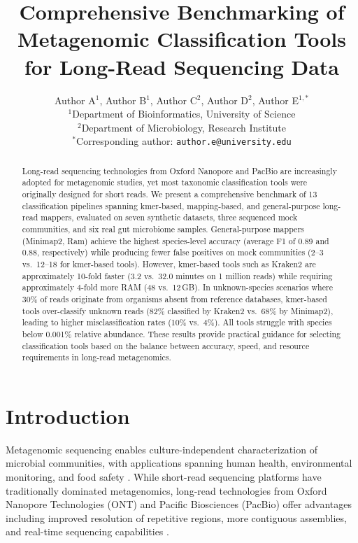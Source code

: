 \documentclass[11pt]{article}
\title{Comprehensive Benchmarking of Metagenomic Classification Tools for Long-Read Sequencing Data}
\author{%
  Author A$^{1}$, Author B$^{1}$, Author C$^{2}$, Author D$^{2}$, Author E$^{1,*}$\\[6pt]
  $^{1}$Department of Bioinformatics, University of Science\\
  $^{2}$Department of Microbiology, Research Institute\\[4pt]
  $^{*}$Corresponding author: \texttt{author.e@university.edu}
}
\date{}
\begin{document}
\maketitle

\begin{abstract}
Long-read sequencing technologies from Oxford Nanopore and PacBio are increasingly adopted for metagenomic studies, yet most taxonomic classification tools were originally designed for short reads. We present a comprehensive benchmark of 13 classification pipelines spanning kmer-based, mapping-based, and general-purpose long-read mappers, evaluated on seven synthetic datasets, three sequenced mock communities, and six real gut microbiome samples. General-purpose mappers (Minimap2, Ram) achieve the highest species-level accuracy (average F1 of 0.89 and 0.88, respectively) while producing fewer false positives on mock communities (2--3 vs.\ 12--18 for kmer-based tools). However, kmer-based tools such as Kraken2 are approximately 10-fold faster (3.2 vs.\ 32.0 minutes on 1 million reads) while requiring approximately 4-fold more RAM (48 vs.\ 12\,GB). In unknown-species scenarios where 30\% of reads originate from organisms absent from reference databases, kmer-based tools over-classify unknown reads (82\% classified by Kraken2 vs.\ 68\% by Minimap2), leading to higher misclassification rates (10\% vs.\ 4\%). All tools struggle with species below 0.001\% relative abundance. These results provide practical guidance for selecting classification tools based on the balance between accuracy, speed, and resource requirements in long-read metagenomics.
\end{abstract}

\section{Introduction}

Metagenomic sequencing enables culture-independent characterization of microbial communities, with applications spanning human health, environmental monitoring, and food safety \citep{quince2017shotgun, knight2018best}. While short-read sequencing platforms have traditionally dominated metagenomics, long-read technologies from Oxford Nanopore Technologies (ONT) and Pacific Biosciences (PacBio) offer advantages including improved resolution of repetitive regions, more contiguous assemblies, and real-time sequencing capabilities \citep{logsdon2020long, amarasinghe2020opportunities}.
\end{document}
